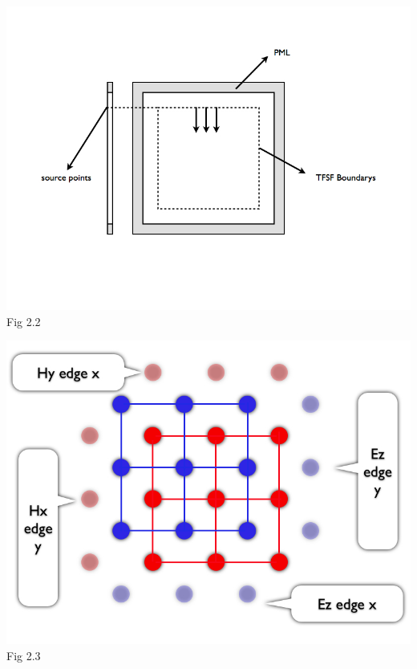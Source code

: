 \documentclass[openany]{book}
\begin{document}
\begin{center}
\includegraphics[scale=0.5]{images/tfsf.jpg}\\
Fig 2.2
\end{center}

\begin{center}
\includegraphics[scale=0.5]{images/pbc.jpg}\\
Fig 2.3
\end{center}
\end{document}
